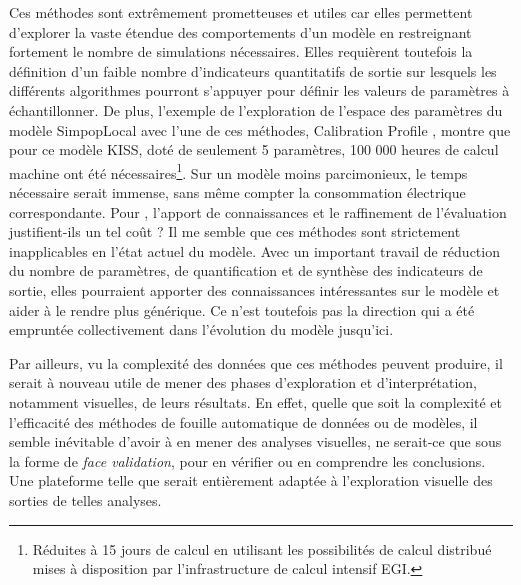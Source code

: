 Ces méthodes sont extrêmement prometteuses et utiles car elles permettent d'explorer la vaste étendue des comportements d'un modèle en restreignant fortement le nombre de simulations nécessaires.
Elles requièrent toutefois la définition d'un faible nombre d'indicateurs quantitatifs de sortie sur lesquels les différents algorithmes pourront s'appuyer pour définir les valeurs de paramètres à échantillonner.
De plus, l'exemple de l'exploration de l'espace des paramètres du modèle SimpopLocal \autocite{schmitt_modelisation_2014} avec l'une de ces méthodes, \og Calibration Profile\fg{} \autocite{reuillon_new_2015}, montre que pour ce modèle KISS, doté de seulement 5 paramètres, 100 000 heures de calcul machine ont été nécessaires\footnote{
	Réduites à 15 jours de calcul en utilisant les possibilités de calcul distribué mises à disposition par l'infrastructure de calcul intensif EGI.
}.
Sur un modèle moins parcimonieux, le temps nécessaire serait immense, sans même compter la consommation électrique correspondante.
Pour \simfeodal{}, l'apport de connaissances et le raffinement de l'évaluation justifient-ils un tel coût ?
Il me semble que ces méthodes sont strictement inapplicables en l'état actuel du modèle.
Avec un important travail de réduction du nombre de paramètres, de quantification et de synthèse des indicateurs de sortie, elles pourraient apporter des connaissances intéressantes sur le modèle et aider à le rendre plus générique.
Ce n'est toutefois pas la direction qui a été empruntée collectivement dans l'évolution du modèle jusqu'ici. 

Par ailleurs, vu la complexité des données que ces méthodes peuvent produire, il serait à nouveau utile de mener des phases d'exploration et d'interprétation, notamment visuelles, de leurs résultats.
En effet, quelle que soit la complexité et l'efficacité des méthodes de fouille automatique de données ou de modèles, il semble inévitable d'avoir à en mener des analyses visuelles, ne serait-ce que sous la forme de \textit{face validation}, pour en vérifier ou en comprendre les conclusions.
Une plateforme telle que \simedb{} serait entièrement adaptée à l'exploration visuelle des sorties de telles analyses.


